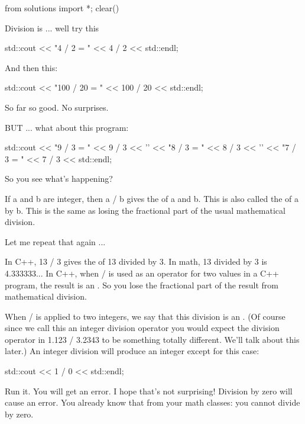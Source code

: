 \begin{python0}
from solutions import *; clear()
\end{python0}

Division is ... well try this
\begin{console}
std::cout << "4 / 2 = " << 4 / 2 << std::endl;
\end{console}

And then this:
\begin{console}
std::cout << "100 / 20 = " << 100 / 20 << std::endl;
\end{console}

So far so good. No surprises.

BUT ... what about this program:
\begin{console}
std::cout << "9 / 3 = " << 9 / 3 << '\n'
          << "8 / 3 = " << 8 / 3 << '\n'
          << "7 / 3 = " << 7 / 3 << std::endl;
\end{console}
So you see what's happening?

If a and b are integer, then a / b gives the  of a and b. This
is also called the  of a by b. This is the same
as losing the fractional part of the usual mathematical division.

Let me repeat that again ...

In C++, 13 / 3 gives the  of 13 divided by 3. In math, 13 divided by 3 is 4.333333... In C++, when / is used as an
operator for two  values in a C++ program, the result is an
. So you lose the fractional part of the result from
mathematical division.

%


When / is applied to two integers, we say that this division is an
. (Of course since we call this an integer
division operator you would expect the division operator in 1.123 / 3.2343
to be something totally different. We'll talk about this later.)
An integer division will produce an integer except for this case:

\begin{console}
std::cout << 1 / 0 << std::endl;
\end{console}

Run it. You will get an error. I hope that's not surprising! Division by zero
will cause an error. You already know that from your math classes: you
cannot divide by zero.


